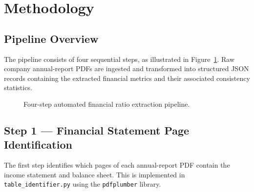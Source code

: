 \documentclass[12pt, a4paper]{article}
\begin{document}
\section{Methodology}
\label{sec:methodology}

\subsection{Pipeline Overview}

The pipeline consists of four sequential steps, as illustrated in
Figure~\ref{fig:pipeline}.  Raw company annual-report PDFs are ingested and
transformed into structured JSON records containing the extracted financial
metrics and their associated consistency statistics.

\begin{figure}[H]
\centering
{}
\caption{Four-step automated financial ratio extraction pipeline.}
\label{fig:pipeline}
\end{figure}

\subsection{Step 1 — Financial Statement Page Identification}
\label{sec:step1}

The first step identifies which pages of each annual-report PDF contain the
income statement and balance sheet.  This is implemented in
\texttt{table\_identifier.py} using the \texttt{pdfplumber} library.
\end{document}
